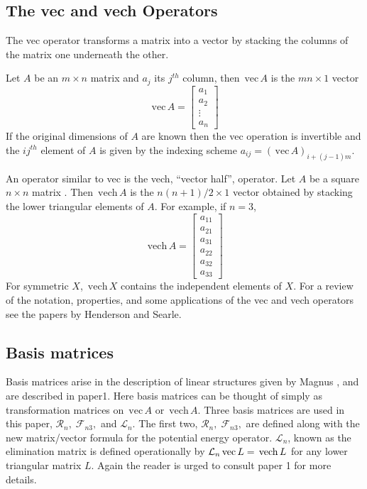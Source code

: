 \documentclass[12pt,thmsa,suthesis,verbatim]{report}
\begin{document}
\subsection{The vec and vech Operators}

The vec operator transforms a matrix into a vector by stacking the columns
of the matrix one underneath the other.

Let $A$ be an $m\times n$ matrix and $a_j$ its $j^{th}$ column, then $\,%
\mathrm{vec}\,A$ is the $mn\times 1$ vector 
\begin{equation}
\,\mathrm{vec}\,A=\left[ 
\begin{array}{c}
a_1 \\ 
a_2 \\ 
\vdots \\ 
a_n
\end{array}
\right]
\end{equation}
If the original dimensions of $A$ are known then the vec operation is
invertible and the $ij^{th}$ element of $A$ is given by the indexing scheme $%
a_{ij}=\left( \,\mathrm{vec}\,A\right) _{i+\left( j-1\right) m}$.

An operator similar to vec is the vech, ``vector half'', operator. Let $A$
be a square $n\times n$ matrix . Then $\,\mathrm{vech}\,A$ is the $n\left(
n+1\right) /2\times 1$ vector obtained by stacking the lower triangular
elements of $A$. For example, if $n=3$, 
\begin{equation}
\,\mathrm{vech}\,A=\left[ 
\begin{array}{c}
a_{11} \\ 
a_{21} \\ 
a_{31} \\ 
a_{22} \\ 
a_{32} \\ 
a_{33}
\end{array}
\right]
\end{equation}
For symmetric $X$, $\,\mathrm{vech}\,X$ contains the independent elements of 
$X$. For a review of the notation, properties, and some applications of the
vec and vech operators see the papers by Henderson and Searle\cite
{HendersonSearle79,HendersonSearle80}.

\subsection{Basis matrices}

Basis matrices arise in the description of linear structures given by Magnus%
\cite{Magnus88}, and are described in paper1. Here basis matrices can be
thought of simply as transformation matrices on $\,\mathrm{vec}\,A$ or $\,%
\mathrm{vech}\,A$. Three basis matrices are used in this paper, $\mathcal{R}%
_n,\;\mathcal{F}_{n3},$ and $\mathcal{L}_n$. The first two, $\mathcal{R}_n,\;%
\mathcal{F}_{n3},$ are defined along with the new matrix/vector formula for
the potential energy operator. $\mathcal{L}_n$, known as the elimination
matrix is defined operationally by $\mathcal{L}_n\,\mathrm{vec}\,L=\,\mathrm{%
vech}\,L$ for any lower triangular matrix $L.$ Again the reader is urged to
consult paper 1 for more details.
\end{document}

